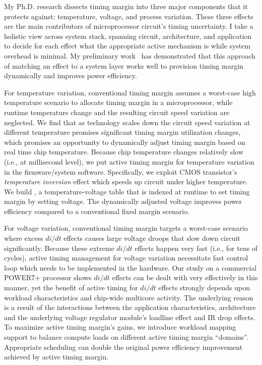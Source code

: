 My Ph.D. research dissects timing margin into three major components that it protects against: temperature, voltage, and process variation. These three effects are the main contributors of microprocessor circuit's timing uncertainty. I take a holistic view across system stack, spanning circuit, architecture, and application to decide for each effect what the appropriate active mechanism is while system overhead is minimal. My preliminary work~\cite{leng2015gpu,zu2015adaptive,zu2016t} has demonstrated that this approach of matching an effect to a system layer works well to provision timing margin dynamically and improves power efficiency.

For temperature variation, conventional timing margin assumes a worst-case high temperature scenario to allocate timing margin in a microprocessor, while runtime temperature change and the resulting circuit speed variation are neglected. We find that as technology scales down the circuit speed variation at different temperature promises significant timing margin utilization changes, which promises an opportunity to dynamically adjust timing margin based on real time chip temperature. Because chip temperature changes relatively slow (i.e., at millisecond level), we put active timing margin for temperature variation in the firmware/system software. Specifically, we exploit CMOS transistor's \textit{temperature inversion} effect which speeds up circuit under higher temperature. We build \tistates, a temperature-voltage table that is indexed at runtime to set timing margin by setting voltage. The dynamically adjusted voltage improves power efficiency compared to a conventional fixed margin scenario.

For voltage variation, conventional timing margin targets a worst-case scenario where excess $di/dt$ effects causes large voltage droops that slow down circuit significantly. Because these extreme $di/dt$ effects happen very fast (i.e., for tens of cycles), active timing management for voltage variation necessitate fast control loop which needs to be implemented in the hardware. Our study on a commercial POWER7+ processor shows $di/dt$ effects can be dealt with very effectively in this manner, yet the benefit of active timing for $di/dt$ effects strongly depends upon workload characteristics and chip-wide multicore activity. The underlying reason is a result of the interactions between the application characteristics, architecture and the underlying voltage regulator module's loadline effect and IR drop effects. To maximize active timing margin's gains, we introduce workload mapping support to balance compute loads on different active timing margin ``domains''. Appropriate scheduling can double the original power efficiency improvement achieved by active timing margin.


